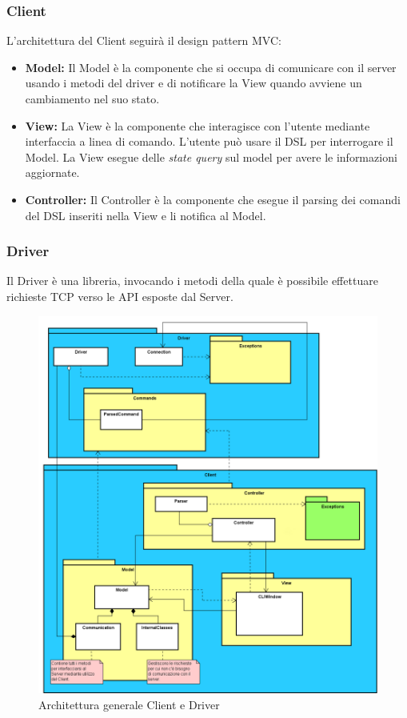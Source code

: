 \documentclass[a4paper]{article}
\begin{document}
        \subsubsection{Client}
        	L'architettura del Client seguirà il design pattern MVC:
            \begin{itemize}
				\item \textbf{Model:}
                	Il Model è la componente che si occupa di comunicare con il server usando i metodi del driver e di notificare la View quando avviene un cambiamento nel suo stato.
                \item \textbf{View:}
                	La View è la componente che interagisce con l'utente mediante interfaccia a linea di comando. L'utente può usare il DSL per interrogare il Model. La View esegue delle \emph{state query} sul model per avere le informazioni aggiornate.
                \item \textbf{Controller:}
                	Il Controller è la componente che esegue il parsing dei comandi del DSL inseriti nella View e li notifica al Model.			
			\end{itemize}
        
        \subsubsection{Driver}
        	Il Driver è una libreria, invocando i metodi della quale è possibile effettuare richieste TCP verso le API esposte dal Server.
        \begin{figure} [H]
			\centering
			\includegraphics[scale=0.35]{ST/Client/GeneraleClient.png}
        	\caption{Architettura generale Client e Driver}
		\end{figure}
            
\end{document}
